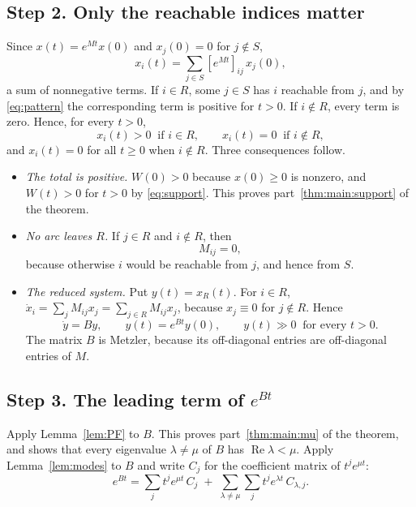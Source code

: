 \documentclass[11pt]{article}
\theoremstyle{definition}
\theoremstyle{remark}
\renewcommand{\Re}{\operatorname{Re}}
\begin{document}
\subsection*{Step 2. Only the reachable indices matter}

Since $x(t) = e^{Mt} x(0)$ and $x_j(0) = 0$ for $j \notin S$,
\[
  x_i(t) = \sum_{j \in S} [e^{Mt}]_{ij}\, x_j(0) ,
\]
a sum of nonnegative terms. If $i \in R$, some $j \in S$ has $i$ reachable from $j$, and by
\eqref{eq:pattern} the corresponding term is positive for $t > 0$. If $i \notin R$, every term is
zero. Hence, for every $t > 0$,
\begin{equation}\label{eq:support}
  x_i(t) > 0 \ \text{ if } i \in R,
  \qquad
  x_i(t) = 0 \ \text{ if } i \notin R,
\end{equation}
and $x_i(t) = 0$ for all $t \ge 0$ when $i \notin R$. Three consequences follow.

\begin{itemize}[leftmargin=2em]
  \item \emph{The total is positive.} $W(0) > 0$ because $x(0) \ge 0$ is nonzero, and $W(t) > 0$
        for $t > 0$ by \eqref{eq:support}. This proves
        part~\ref{thm:main:support} of the theorem.
  \item \emph{No arc leaves $R$.} If $j \in R$ and $i \notin R$, then
        \begin{equation}\label{eq:noarc}
          M_{ij} = 0 ,
        \end{equation}
        because otherwise $i$ would be reachable from $j$, and hence from $S$.
  \item \emph{The reduced system.} Put $y(t) = x_R(t)$. For $i \in R$,
        $\dot{x}_i = \sum_{j} M_{ij} x_j = \sum_{j \in R} M_{ij} x_j$, because $x_j \equiv 0$ for
        $j \notin R$. Hence
        \[
          \dot{y} = By, \qquad y(t) = e^{Bt} y(0), \qquad y(t) \gg 0 \ \text{ for every } t > 0 .
        \]
        The matrix $B$ is Metzler, because its off-diagonal entries are off-diagonal entries of $M$.
\end{itemize}

\subsection*{Step 3. The leading term of $e^{Bt}$}

Apply Lemma~\ref{lem:PF} to $B$. This proves part~\ref{thm:main:mu} of the theorem, and shows that
every eigenvalue $\lambda \ne \mu$ of $B$ has $\Re\lambda < \mu$. Apply Lemma~\ref{lem:modes} to
$B$ and write $C_j$ for the coefficient matrix of $t^{j} e^{\mu t}$:
\begin{equation}\label{eq:expansion}
  e^{Bt} = \sum_{j} t^{j} e^{\mu t}\, C_j
  \;+\; \sum_{\lambda \ne \mu} \sum_{j} t^{j} e^{\lambda t}\, C_{\lambda,j} .
\end{equation}
\end{document}
